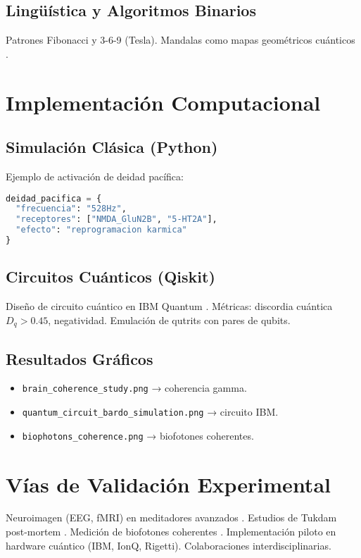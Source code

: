 \documentclass[12pt,a4paper]{article}
\begin{document}
\subsection{Lingüística y Algoritmos Binarios}
Patrones Fibonacci y 3-6-9 (Tesla). Mandalas como mapas geométricos cuánticos 
\cite{kyoto2024linguistics, watanabe2024mandalas}.

\section{Implementación Computacional}

\subsection{Simulación Clásica (Python)}
Ejemplo de activación de deidad pacífica:
\begin{lstlisting}[language=Python]
deidad_pacifica = {
  "frecuencia": "528Hz",
  "receptores": ["NMDA_GluN2B", "5-HT2A"],
  "efecto": "reprogramacion karmica"
}
\end{lstlisting}

\subsection{Circuitos Cuánticos (Qiskit)}
Diseño de circuito cuántico en IBM Quantum \cite{ibm2025qiskit}. 
Métricas: discordia cuántica $D_q > 0.45$, negatividad. 
Emulación de qutrits con pares de qubits.

\subsection{Resultados Gráficos}
\begin{itemize}
  \item \texttt{brain\_coherence\_study.png} → coherencia gamma.
  \item \texttt{quantum\_circuit\_bardo\_simulation.png} → circuito IBM.
  \item \texttt{biophotons\_coherence.png} → biofotones coherentes.
\end{itemize}

\section{Vías de Validación Experimental}
Neuroimagen (EEG, fMRI) en meditadores avanzados \cite{wisconsin2022gamma}.  
Estudios de Tukdam post-mortem \cite{mindlife2023tukdam}.  
Medición de biofotones coherentes \cite{stanford2023clearlight}.  
Implementación piloto en hardware cuántico (IBM, IonQ, Rigetti).  
Colaboraciones interdisciplinarias.
\end{document}
